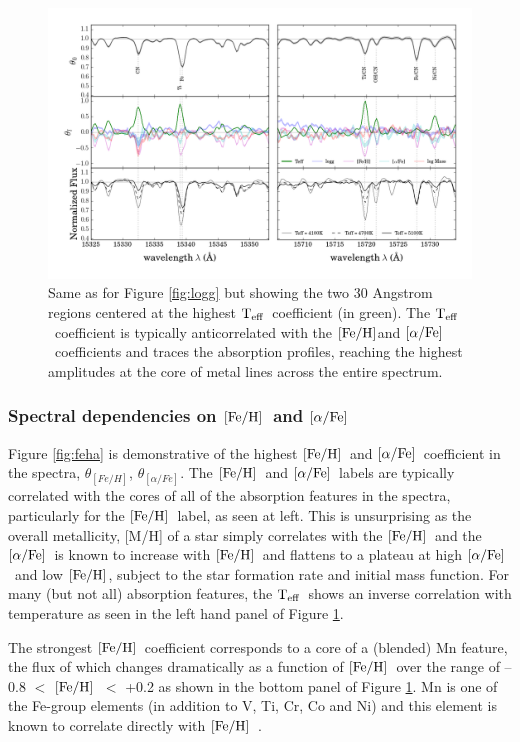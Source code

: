\documentclass[12pt, preprint]{aastex}
\newcommand{\teff}{\mbox{$\rm T_{eff}$}}
\newcommand{\feh}{\mbox{$\rm [Fe/H]$}}
\newcommand{\alphafe}{\mbox{$\rm [\alpha/Fe]$}}
\begin{document}
\begin{figure}[p]
\centering
    \includegraphics[scale=0.51]{./plots/coeffs_t_3.png}
  \caption{Same as for Figure \ref{fig:logg} but showing the two 30 Angstrom regions centered at the highest \teff\ coefficient (in green). The \teff\ coefficient is typically anticorrelated with the \feh and \alphafe\ coefficients and traces the absorption profiles, reaching the highest amplitudes at the core of metal lines across the entire spectrum.}
\label{fig:teff}
\end{figure}


\subsubsection{Spectral dependencies on \feh\ and \alphafe} 

Figure \ref{fig:feha} is demonstrative of the highest \feh\ and \alphafe\ coefficient in the spectra, $\theta_{[Fe/H]}$, $\theta_{[\alpha/Fe]}$. The \feh\ and \alphafe\ labels are typically correlated with the cores of all of the absorption features in the spectra, particularly for the \feh\ label, as seen at left. This is unsurprising as the overall metallicity,  [M/H] of  a star simply correlates with the \feh\ and the \alphafe\ is known to increase with \feh\ and flattens to a plateau at high \alphafe\ and low \feh, subject to the star formation rate and initial mass function. For many (but not all) absorption features, the \teff\ shows an inverse correlation with temperature as seen in the left hand panel of Figure \ref{fig:teff}. 

The strongest \feh\ coefficient corresponds to a core of a (blended) Mn feature, the flux of which changes dramatically as a function of \feh\ over the range of  --0.8 $<$ \feh\ $<$ +0.2 as shown in the bottom panel of Figure \ref{fig:teff}. Mn is one of the Fe-group elements (in addition to V, Ti, Cr, Co and Ni) and this element is known to correlate directly with \feh\ \citep[see][]{Maria2008, B2015}. 
\end{document}
